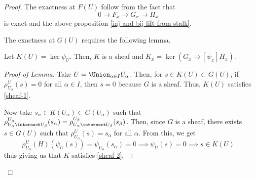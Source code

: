 \documentclass[11pt,leqno,oneside]{amsbook}
\renewcommand{\F}{F} %
\newcommand{\G}{G}
\renewcommand{\H}{H}
\newcommand{\K}{K}
\numberwithin{thm}{section}
\begin{document}
\begin{proof}
  The exactness at \(\F(U)\) follow from the fact that \[
    0 \to \F_x \to \G_x \to \H_x
  \]
  is exact and the above proposition
  \ref{inj-and-bij-lift-from-stalk}.

  The exactness at \(\G(U)\) requires the following lemma.
  \begin{lem}
    Let \(\K(U) = \ker \psi_U\). Then, \(\K\) is a sheaf and \(\K_x =
    \ker(\G_x \to[\psi_x] \H_x)\).
  \end{lem}
  \begin{proof}[Proof of Lemma]
    Take \(U = \Union_{\alpha \in I} U_\alpha\). Then, for \(s \in
    \K(U) \subset \G(U)\), if
    \(\rho^U_{U_\alpha}(s) = 0\) for all \(\alpha \in I\), then \(s 
    = 0\) because \(\G\) is a sheaf. Thus, \(\K(U)\) satisfies
    \ref{sheaf-1}.

    Now take \(s_\alpha \in \K(U_\alpha) \subset \G(U_\alpha)\) such
    that \(\rho^{U_\alpha}_{U_\alpha \intersect U_\beta}(s_\alpha) =
    \rho^{U_\beta}_{U_\alpha \intersect U_\beta}(s_\beta)\). Then,
    since \(\G\) is a sheaf, there exists \(s \in \G(U)\) such that
    \(\rho^U_{U_\alpha}(s) = s_\alpha\) for all \(\alpha\). From this,
    we get \[
      \rho^U_{U_\alpha}(\H)(\psi_U(s)) = \psi_{U_\alpha}(s_\alpha) = 0
      \implies \psi_U(s) = 0 \implies s \in \K(U)
    \]
    thus giving us that \(\K\) satisfies \ref{sheaf-2}.
  \end{proof}
\end{proof}
\begin{bibdiv}
  \begin{biblist}
  \end{biblist}
\end{bibdiv}
\end{document}
